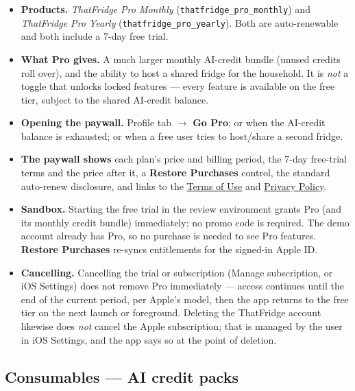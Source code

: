\documentclass[11pt]{article}
\begin{document}
\begin{itemize}
  \item \textbf{Products.} \emph{ThatFridge Pro Monthly} (\texttt{thatfridge\_pro\_monthly})
        and \emph{ThatFridge Pro Yearly} (\texttt{thatfridge\_pro\_yearly}). Both are
        auto-renewable and both include a 7-day free trial.
  \item \textbf{What Pro gives.} A much larger monthly AI-credit bundle (unused credits roll
        over), and the ability to host a shared fridge for the household. It is \emph{not} a
        toggle that unlocks locked features --- every feature is available on the free tier,
        subject to the shared AI-credit balance.
  \item \textbf{Opening the paywall.} Profile tab $\rightarrow$ \textbf{Go Pro}; or when the
        AI-credit balance is exhausted; or when a free user tries to host/share a second
        fridge.
  \item \textbf{The paywall shows} each plan's price and billing period, the 7-day
        free-trial terms and the price after it, a \textbf{Restore Purchases} control, the
        standard auto-renew disclosure, and links to the
        \href{https://thatfridge.com/terms/}{Terms of Use} and
        \href{https://thatfridge.com/privacy/}{Privacy Policy}.
  \item \textbf{Sandbox.} Starting the free trial in the review environment grants Pro (and
        its monthly credit bundle) immediately; no promo code is required. The demo account
        already has Pro, so no purchase is needed to see Pro features.
        \textbf{Restore Purchases} re-syncs entitlements for the signed-in Apple ID.
  \item \textbf{Cancelling.} Cancelling the trial or subscription (Manage subscription, or
        iOS Settings) does not remove Pro immediately --- access continues until the end of
        the current period, per Apple's model, then the app returns to the free tier on the
        next launch or foreground. Deleting the ThatFridge account likewise does \emph{not}
        cancel the Apple subscription; that is managed by the user in iOS Settings, and the
        app says so at the point of deletion.
\end{itemize}

\subsection{Consumables --- AI credit packs}
\end{document}
